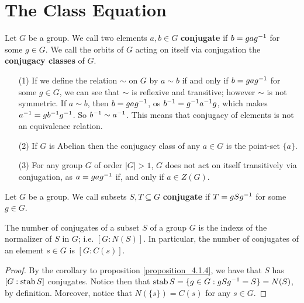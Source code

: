 \section{The Class Equation}
\label{section_4.3}

\begin{definition}
  Let $G$ be a group. We call two elements  $a,b \in G$ \textbf{conjugate} if
  $b=gag^{-1}$ for some $g \in G$. We call the orbits of $G$ acting on itself
  via conjugation the \textbf{conjugacy classes} of $G$.
\end{definition}

\begin{example}\label{example_4.7}
  \begin{enumerate}
    \item[(1)] If we define the relation $\sim$ on $G$ by $a \sim b$ if and
      only if  $b=gag^{-1}$ for some $g \in G$, we can see that  $\sim$
      is reflexive and transitive; however  $\sim$ is not symmetric. If $a
      \sim b$, then  $b=gag^{-1}$, os $b^{-1}=g^{-1}a^{-1}g$, which
      makes $a^{-1}=gb^{-1}g^{-1}$. So $b^{-1} \sim a^{-1}$. This
      means that conjugacy of elements is not an equivalence relation.

    \item[(2)] If $G$ is Abelian then the conjugacy class of any $a \in G$
      is the point-set $\{a\}$.

    \item[(3)] For any group $G$ of order  $|G|>1$, $G$ does not act on
      itself transitively via conjugation, as  $a=gag^{-1}$ if, and only
      if $a \in Z(G)$.
  \end{enumerate}
\end{example}

\begin{definition}
  Let $G$ be a group. We call subsets  $S,T \subseteq G$  \textbf{conjugate}
  if $T=gSg^{-1}$ for some $g \in G$.
\end{definition}

\begin{proposition}\label{proposition_4.3.1}
  The number of conjugates of a subset $S$ of a group  $G$ is the indexs of
  the normalizer of $S$ in $G$; i.e.  $[G:N(S)]$. In particular, the number of
  conjugates of an element $s \in G$ is  $[G:C(s)]$.
\end{proposition}
\begin{proof}
  By the corollary to proposition \ref{proposition_4.1.4}, we have that $S$ has  $[G:\operatorname{stab}{S}]$
  conjugates. Notice then that $\operatorname{stab}{S}=\{g \in G : gSg^{-1}=S\}=N(S)$, by
  definition. Moreover, notice that $N(\{s\})=C(s)$ for any $s \in G$.
\end{proof}

